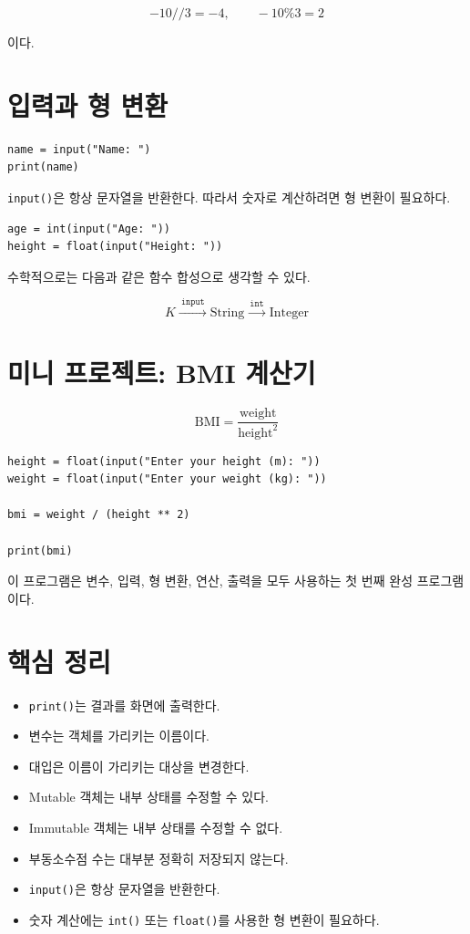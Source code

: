 \documentclass[11pt,a4paper]{article}
\begin{document}
\[
-10//3=-4,\qquad -10\%3=2
\]

이다.

\section{입력과 형 변환}

\begin{lstlisting}
name = input("Name: ")
print(name)
\end{lstlisting}

\texttt{input()}은 항상 문자열을 반환한다. 따라서 숫자로 계산하려면 형 변환이 필요하다.

\begin{lstlisting}
age = int(input("Age: "))
height = float(input("Height: "))
\end{lstlisting}

수학적으로는 다음과 같은 함수 합성으로 생각할 수 있다.

\[
K
\xrightarrow{\ \texttt{input}\ }
\mathrm{String}
\xrightarrow{\ \texttt{int}\ }
\mathrm{Integer}
\]

\section{미니 프로젝트: BMI 계산기}

\[
\mathrm{BMI}
=
\frac{\mathrm{weight}}{\mathrm{height}^{2}}
\]

\begin{lstlisting}
height = float(input("Enter your height (m): "))
weight = float(input("Enter your weight (kg): "))

bmi = weight / (height ** 2)

print(bmi)
\end{lstlisting}

이 프로그램은 변수, 입력, 형 변환, 연산, 출력을 모두 사용하는 첫 번째 완성 프로그램이다.

\section{핵심 정리}

\begin{itemize}
  \item \texttt{print()}는 결과를 화면에 출력한다.
  \item 변수는 객체를 가리키는 이름이다.
  \item 대입은 이름이 가리키는 대상을 변경한다.
  \item Mutable 객체는 내부 상태를 수정할 수 있다.
  \item Immutable 객체는 내부 상태를 수정할 수 없다.
  \item 부동소수점 수는 대부분 정확히 저장되지 않는다.
  \item \texttt{input()}은 항상 문자열을 반환한다.
  \item 숫자 계산에는 \texttt{int()} 또는 \texttt{float()}를 사용한 형 변환이 필요하다.
\end{itemize}
\end{document}

